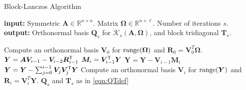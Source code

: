 \begin{algorithm}
\caption{Block-Lanczos Algorithm}
\label{alg:block_lanczos}
\textbf{input:} Symmetric $\bm{A} \in \mathbb{R}^{n \times n}$. Matrix $\bm{\Omega} \in \mathbb{R}^{n \times \ell}$. Number of iterations $s$.\\
\textbf{output:} Orthonormal basis $\bm{Q}_s$ for $\mathcal{K}_{s}(\bm{A}, \bm{\Omega})$,
and block tridiagonal $\bm{T}_s$.
\begin{algorithmic}[1]
    \State Compute an orthonormal basis $\bm{V}_0$ for $\operatorname{range}(\bm{\Omega})$ and $\bm{R}_0 = \bm{V}_0^T \bm{\Omega}$.
    \State $\bm{Y} = \bm{A} \bm{V}_{i-1} - \bm{V}_{i-2} \bm{R}_{i-1}^{\textsf{\textup{T}}}$ 
    \State $\bm{M}_i = \bm{V}_{i-1}^{\textsf{\textup{T}}} \bm{Y}$ 
    \State $\bm{Y} = \bm{Y} - \bm{V}_{i-1}\bm{M}_i$
    \State $\bm{Y} = \bm{Y} - \sum_{j=0}^{i-1} \bm{V}_j\bm{V}_j^{\textsf{\textup{T}}} \bm{Y}$ 
    \State Compute an orthonormal basis $\bm{V}_i$ for $\operatorname{range}(\bm{Y})$ and $\bm{R}_i = \bm{V}_i^T \bm{Y}$. \label{alg:line:qr}
    \EndFor
    \State \Return $\bm{Q}_s$ and $\bm{T}_s$ as in \cref{eqn:QTdef}
\end{algorithmic}
\end{algorithm}


